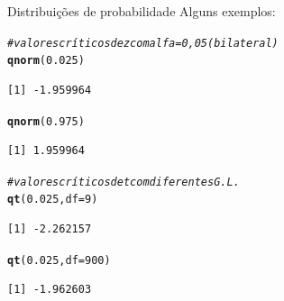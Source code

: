 \documentclass[10pt]{beamer}\usepackage[]{graphicx}\usepackage[]{color}
\makeatletter
\newcommand{\hlnum}[1]{\textcolor[rgb]{0.686,0.059,0.569}{#1}}%
\newcommand{\hlcom}[1]{\textcolor[rgb]{0.678,0.584,0.686}{\textit{#1}}}%
\newcommand{\hlstd}[1]{\textcolor[rgb]{0.345,0.345,0.345}{#1}}%
\newcommand{\hlkwc}[1]{\textcolor[rgb]{0.333,0.667,0.333}{#1}}%
\newcommand{\hlkwd}[1]{\textcolor[rgb]{0.737,0.353,0.396}{\textbf{#1}}}%
\newenvironment{kframe}{%
 \def\at@end@of@kframe{}%
 \ifinner\ifhmode%
  \def\at@end@of@kframe{\end{minipage}}%
  \begin{minipage}{\columnwidth}%
 \fi\fi%
 \def\FrameCommand##1{\hskip\@totalleftmargin \hskip-\fboxsep
 \colorbox{shadecolor}{##1}\hskip-\fboxsep
     \hskip-\linewidth \hskip-\@totalleftmargin \hskip\columnwidth}%
 \MakeFramed {\advance\hsize-\width
   \@totalleftmargin\z@ \linewidth\hsize
   \@setminipage}}%
 {\par\unskip\endMakeFramed%
 \at@end@of@kframe}
\newenvironment{knitrout}{}{} %
\theoremstyle{definition}
\makeatother
\begin{document}
\begin{frame}[fragile=singleslide]{Distribuições de probabilidade}
Alguns exemplos:
\begin{knitrout}\small
{}\color{fgcolor}\begin{kframe}
\begin{alltt}
\hlcom{# valores críticos de z com alfa = 0,05 (bilateral)}
\hlkwd{qnorm}\hlstd{(}\hlnum{0.025}\hlstd{)}
\end{alltt}
\begin{verbatim}
[1] -1.959964
\end{verbatim}
\begin{alltt}
\hlkwd{qnorm}\hlstd{(}\hlnum{0.975}\hlstd{)}
\end{alltt}
\begin{verbatim}
[1] 1.959964
\end{verbatim}
\begin{alltt}
\hlcom{# valores críticos de t com diferentes G.L.}
\hlkwd{qt}\hlstd{(}\hlnum{0.025}\hlstd{,} \hlkwc{df} \hlstd{=} \hlnum{9}\hlstd{)}
\end{alltt}
\begin{verbatim}
[1] -2.262157
\end{verbatim}
\begin{alltt}
\hlkwd{qt}\hlstd{(}\hlnum{0.025}\hlstd{,}\hlkwc{df} \hlstd{=} \hlnum{900}\hlstd{)}
\end{alltt}
\begin{verbatim}
[1] -1.962603
\end{verbatim}
\end{kframe}
\end{knitrout}
\end{frame}
\end{document}
